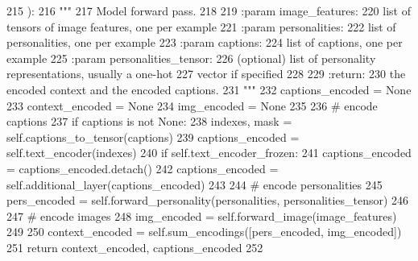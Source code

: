 \begin{DoxyCode}
215     ):
216         \textcolor{stringliteral}{"""}
217 \textcolor{stringliteral}{        Model forward pass.}
218 \textcolor{stringliteral}{}
219 \textcolor{stringliteral}{        :param image\_features:}
220 \textcolor{stringliteral}{            list of tensors of image features, one per example}
221 \textcolor{stringliteral}{        :param personalities:}
222 \textcolor{stringliteral}{            list of personalities, one per example}
223 \textcolor{stringliteral}{        :param captions:}
224 \textcolor{stringliteral}{            list of captions, one per example}
225 \textcolor{stringliteral}{        :param personalities\_tensor:}
226 \textcolor{stringliteral}{            (optional) list of personality representations, usually a one-hot}
227 \textcolor{stringliteral}{            vector if specified}
228 \textcolor{stringliteral}{}
229 \textcolor{stringliteral}{        :return:}
230 \textcolor{stringliteral}{            the encoded context and the encoded captions.}
231 \textcolor{stringliteral}{        """}
232         captions\_encoded = \textcolor{keywordtype}{None}
233         context\_encoded = \textcolor{keywordtype}{None}
234         img\_encoded = \textcolor{keywordtype}{None}
235 
236         \textcolor{comment}{# encode captions}
237         \textcolor{keywordflow}{if} captions \textcolor{keywordflow}{is} \textcolor{keywordflow}{not} \textcolor{keywordtype}{None}:
238             indexes, mask = self.captions\_to\_tensor(captions)
239             captions\_encoded = self.text\_encoder(indexes)
240             \textcolor{keywordflow}{if} self.text\_encoder\_frozen:
241                 captions\_encoded = captions\_encoded.detach()
242             captions\_encoded = self.additional\_layer(captions\_encoded)
243 
244         \textcolor{comment}{# encode personalities}
245         pers\_encoded = self.forward\_personality(personalities, personalities\_tensor)
246 
247         \textcolor{comment}{# encode images}
248         img\_encoded = self.forward\_image(image\_features)
249 
250         context\_encoded = self.sum\_encodings([pers\_encoded, img\_encoded])
251         \textcolor{keywordflow}{return} context\_encoded, captions\_encoded
252 
\end{DoxyCode}
\mbox{\label{classprojects_1_1personality__captions_1_1transresnet_1_1modules_1_1TransresnetModel_aee5f9d98e2c82024cc76dd1227c63f9e}} 
